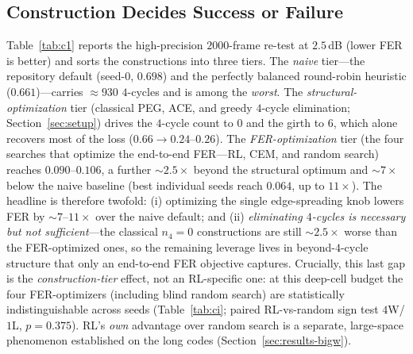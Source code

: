\documentclass[journal]{IEEEtran}
\begin{document}
\subsection{Construction Decides Success or Failure}\label{sec:results-c1}
Table~\ref{tab:c1} reports the high-precision $2000$-frame re-test at $2.5$\,dB
(lower FER is better) and sorts the constructions into three tiers. The
\emph{naive} tier---the repository default (seed-0, $0.698$) and the perfectly
balanced round-robin heuristic ($0.661$)---carries $\approx\!930$ $4$-cycles and
is among the \emph{worst}. The \emph{structural-optimization} tier (classical PEG,
ACE, and greedy $4$-cycle elimination; Section~\ref{sec:setup}) drives the
$4$-cycle count to $0$ and the girth to $6$, which alone recovers most of the
loss ($0.66\!\to\!0.24$--$0.26$). The \emph{FER-optimization} tier (the four
searches that optimize the end-to-end FER---RL, CEM, and random search) reaches
$0.090$--$0.106$, a further $\sim\!2.5\times$ beyond the structural optimum and
$\sim\!7\times$ below the naive baseline (best individual seeds reach $0.064$, up
to $11\times$). The headline is therefore twofold: (i) optimizing the single
edge-spreading knob lowers FER by $\sim\!7$--$11\times$ over the naive default;
and (ii) \emph{eliminating $4$-cycles is necessary but not sufficient}---the
classical $n_4{=}0$ constructions are still $\sim\!2.5\times$ worse than the
FER-optimized ones, so the remaining leverage lives in beyond-$4$-cycle structure
that only an end-to-end FER objective captures. Crucially, this last gap is the
\emph{construction-tier} effect, not an RL-specific one: at this deep-cell budget
the four FER-optimizers (including blind random search) are statistically
indistinguishable across seeds (Table~\ref{tab:ci}; paired RL-vs-random sign test
$4$W/$1$L, $p{=}0.375$). RL's \emph{own} advantage over random search is a
separate, large-space phenomenon established on the long codes
(Section~\ref{sec:results-bigw}).
\end{document}

